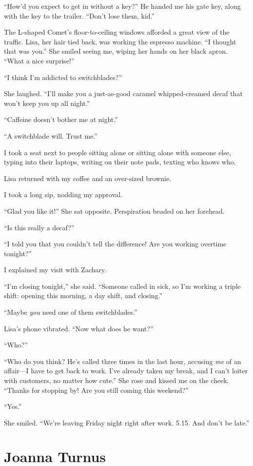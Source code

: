 ``How'd you expect to get in without a key?'' He handed me his gate key,
along with the key to the trailer. ``Don't lose them, kid.''

The L-shaped Comet's floor-to-ceiling windows afforded a great view of
the traffic. Lisa, her hair tied back, was working the espresso machine.
``I thought that was you.'' She smiled seeing me, wiping her hands on
her black apron. ``What a nice surprise!''

``I think I'm addicted to switchblades?''

She laughed. ``I'll make you a just-as-good caramel whipped\--\-creamed
decaf that won't keep you up all night.''

``Caffeine doesn't bother me at night.''

``A switchblade will. Trust me.''

I took a seat next to people sitting alone or sitting alone with someone
else, typing into their laptops, writing on their note pads, texting who
knows who.

Lisa returned with my coffee and an over-sized brownie.

I took a long sip, nodding my approval.

``Glad you like it!'' She sat opposite. Perspiration beaded on her
forehead.

``Is this really a decaf?''

``I told you that you couldn't tell the difference! Are you working
overtime tonight?''

I explained my visit with Zachary.

``I'm closing tonight,'' she said. ``Someone called in sick, so I'm
working a triple shift: opening this morning, a day shift, and
closing.''

``Maybe \emph{you} need one of them switchblades.''

Lisa's phone vibrated. ``Now what does he want?''

``Who?''

``Who do you think? He's called three times in the last hour, accusing
\emph{me} of an affair---I have to get back to work. I've already taken
my break, and I can't loiter with customers, no matter how cute.'' She
rose and kissed me on the cheek. ``Thanks for stopping by! Are you still
coming this weekend?''

``Yes.''

She smiled. ``We're leaving Friday night right after work. 5.15. And
don't be late.''

\chapter{Joanna Turnus}

